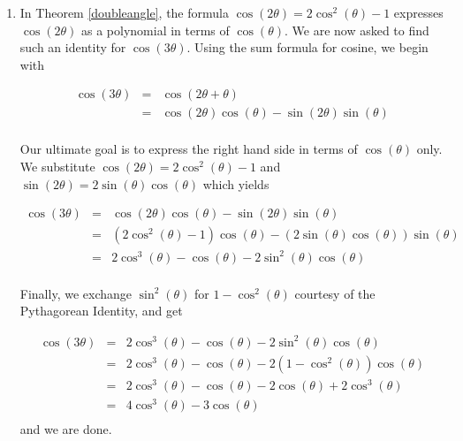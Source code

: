 {\begin{enumerate}
\[\begin{array}{rcl}
\end{array} \]

\item In Theorem \ref{doubleangle}, the formula $\cos(2\theta) = 2\cos^{2}(\theta) - 1$ expresses $\cos(2\theta)$ as a polynomial in terms of $\cos(\theta)$.  We are  now asked to find such an  identity for $\cos(3\theta)$.  Using the sum formula for cosine, we begin with 


\[ \begin{array}{rcl}

\cos(3\theta) & = & \cos(2\theta + \theta) \\ [2pt]
              & = & \cos(2\theta)\cos(\theta) - \sin(2\theta)\sin(\theta) \\
\end{array}\]

Our ultimate goal is to express the right hand side in terms of $\cos(\theta)$ only.  We substitute $\cos(2\theta) = 2\cos^{2}(\theta) -1$ and $\sin(2\theta) = 2\sin(\theta)\cos(\theta)$ which yields


\[ \begin{array}{rcl}

\cos(3\theta) & = &  \cos(2\theta)\cos(\theta) - \sin(2\theta)\sin(\theta) \\ [2pt]
              & = & \left(2\cos^{2}(\theta) - 1\right) \cos(\theta) - \left(2 \sin(\theta) \cos(\theta) \right)\sin(\theta) \\ [2pt] 
              & = & 2\cos^{3}(\theta)- \cos(\theta) - 2 \sin^2(\theta) \cos(\theta) \\
              
\end{array}\]

Finally, we exchange $\sin^{2}(\theta)$ for $1 - \cos^{2}(\theta)$ courtesy of the Pythagorean Identity, and get

\[ \begin{array}{rcl}

\cos(3\theta) & = & 2\cos^{3}(\theta)- \cos(\theta) - 2 \sin^2(\theta) \cos(\theta) \\ [2pt]
              & = & 2\cos^{3}(\theta)- \cos(\theta) - 2 \left(1 - \cos^{2}(\theta)\right) \cos(\theta) \\ [2pt]
              & = & 2\cos^{3}(\theta)- \cos(\theta) - 2\cos(\theta) + 2\cos^{3}(\theta) \\ [2pt]
              & = & 4\cos^{3}(\theta)- 3\cos(\theta) \\
\end{array}\]        
 and we are done.           
              
\end{enumerate}
}

